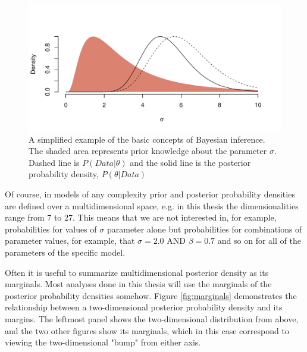 \documentclass{article}\usepackage{knitr}
\begin{document}
\begin{figure}
\centering
\begin{knitrout}
\color{fgcolor}
\includegraphics[width=\maxwidth]{figure/unnamed-chunk-12-1} 

\end{knitrout}
\caption{A simplified example of the basic concepts of Bayesian inference. The shaded area represents prior knowledge about the parameter $\sigma$. Dashed line is $P(Data | \theta)$ and the solid line is the posterior probability density, $P(\theta | Data)$}
\label{fig:priorpost}
\end{figure}

Of course, in models of any complexity prior and posterior probability densities are defined over a multidimensional space, e.g. in this thesis the dimensionalities range from 7 to 27. This means that we are not interested in, for example, probabilities for values of $\sigma$ parameter alone but probabilities for combinations of parameter values, for example, that $\sigma = 2.0$ AND $\beta = 0.7$ and so on for all of the parameters of the specific model.

Often it is useful to summarize multidimensional posterior density as its marginals. Most analyses done in this thesis will use the marginals of  the posterior probability densities somehow. Figure \ref{fig:marginals} demonstrates the relationship between a two-dimensional posterior probability density and its margins. The leftmost panel shows the two-dimensional distribution from above, and the two other figures show its marginals, which in this case correspond to viewing the two-dimensional "bump" from either axis. 
\end{document}
